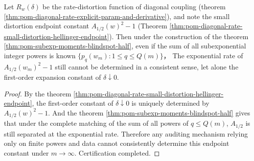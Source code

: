 \begin{corollary}\label{cor:pom-half-endpoint-constant-subexp-mom-invisible}
Let \(R_w(\delta)\) be the rate-distortion function of diagonal coupling (theorem \ref{thm:pom-diagonal-rate-explicit-param-and-derivative}), and note the small distortion endpoint constant
\(
A_{1/2}(w)^2-1
\)
(Theorem \ref{thm:pom-diagonal-rate-small-distortion-hellinger-endpoint}).
Then under the construction of the theorem \ref{thm:pom-subexp-moments-blindspot-half}, even if the sum of all subexponential integer powers is known
\(\{p_q(w_m):1\le q\le Q(m)\}\)，
The exponential rate of \(A_{1/2}(w_m)^2-1\) still cannot be determined in a consistent sense, let alone the first-order expansion constant of \(\delta\downarrow 0\).
\end{corollary}
\begin{proof}
By the theorem \ref{thm:pom-diagonal-rate-small-distortion-hellinger-endpoint}, the first-order constant of \(\delta\downarrow 0\) is uniquely determined by \(A_{1/2}(w)^2-1\).
And the theorem \ref{thm:pom-subexp-moments-blindspot-half} gives that under the complete matching of the sum of all powers of \(q\le Q(m)\), \(A_{1/2}\) is still separated at the exponential rate.
Therefore any auditing mechanism relying only on finite powers and data cannot consistently determine this endpoint constant under \(m\to\infty\). Certification completed.
\end{proof}

